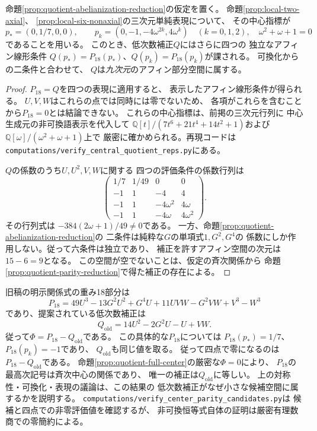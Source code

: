 \begin{proposition}[四つの三次元表現による補正空間の九次元化]
\label{prop:quotient-representation-reduction}
命題\ref{prop:quotient-abelianization-reduction}の仮定を置く。
命題\ref{prop:local-two-axial}、
\ref{prop:local-six-nonaxial}の三次元単純表現について、
その中心指標が
\[
 p_*=(0,1/7,0,0),\qquad
 p_k=(0,-1,-4\omega^{2k},4\omega^k)
 \quad(k=0,1,2),\quad \omega^2+\omega+1=0
\]
であることを用いる。
このとき、低次数補正$Q$にはさらに四つの
独立なアフィン線形条件
$Q(p_*)=P_{18}(p_*)$、$Q(p_k)=P_{18}(p_k)$が課される。
可換化からの二条件と合わせて、
$Q$は\emph{九次元}のアフィン部分空間に属する。
\end{proposition}
\begin{proof}
$P_{18}=Q$を四つの表現に適用すると、
表示したアフィン線形条件が得られる。
$U,V,W$はこれらの点では同時には零でないため、
各項がこれらを含むことから$P_{18}=0$とは結論できない。
これらの中心指標は、前掲の三次元行列に
中心生成元の非可換語表示を代入して
$\mathbb Q[t]/(7t^6+21t^4+14t^2+1)$および
$\mathbb Q[\omega]/(\omega^2+\omega+1)$上で
厳密に確かめられる。再現コードは
\texttt{computations/verify\_central\_quotient\_reps.py}にある。

$Q$の係数のうち$U,U^2,V,W$に関する
四つの評価条件の係数行列は
\[
 \begin{pmatrix}
 1/7&1/49&0&0\\
 -1&1&-4&4\\
 -1&1&-4\omega^2&4\omega\\
 -1&1&-4\omega&4\omega^2
 \end{pmatrix}.
\]
その行列式は
$-384(2\omega+1)/49\ne0$である。
一方、命題\ref{prop:quotient-abelianization-reduction}の
二条件は純粋な$G$の単項式$1,G^2,G^4$の
係数にしか作用しない。従って六条件は独立であり、
補正を許すアフィン空間の次元は$15-6=9$となる。
この空間が空でないことは、仮定の斉次関係から
命題\ref{prop:quotient-parity-reduction}で得た補正の存在による。
\end{proof}

\begin{remark}
\label{rem:quotient-parity-phi}
旧稿の明示関係式の重み18部分は
\[
 P_{18}=49U^3-13G^2U^2+G^4U
          +11UVW-G^2VW+V^3-W^3
\]
であり、提案されている低次数補正は
\[
 Q_{\mathrm{old}}=14U^2-2G^2U-U+VW.
\]
従って$\Phi=P_{18}-Q_{\mathrm{old}}$である。
この具体的な$P_{18}$については
$P_{18}(p_*)=1/7$、$P_{18}(p_k)=-1$であり、
$Q_{\mathrm{old}}$も同じ値を取る。
従って四点で零になるのは$P_{18}-Q_{\mathrm{old}}$である。
命題\ref{prop:quotient-full-center}の厳密な$\Phi=0$により、
$P_{18}$の最高次記号は斉次中心の関係であり、
唯一の補正は$Q_{\mathrm{old}}$に等しい。
上の対称性・可換化・表現の議論は、この結果の
低次数補正がなぜ小さな候補空間に属するかを説明する。
\texttt{computations/verify\_center\_parity\_candidates.py}は
候補と四点での非零評価値を確認するが、
非可換恒等式自体の証明は厳密有理数商での零簡約による。
\end{remark}

